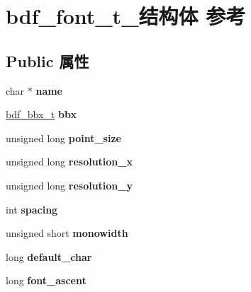 \hypertarget{structbdf__font__t__}{}\section{bdf\+\_\+font\+\_\+t\+\_\+结构体 参考}
\label{structbdf__font__t__}
\subsection*{Public 属性}
\begin{DoxyCompactItemize}
\item 
\mbox{\label{structbdf__font__t___a5913d87c013e04f6ed008bf2c1ae0502}} 
char $\ast$ {\bfseries name}
\item 
\mbox{\label{structbdf__font__t___ac25edda068db746ec01932109af48b4e}} 
\hyperlink{structbdf__bbx__t__}{bdf\+\_\+bbx\+\_\+t} {\bfseries bbx}
\item 
\mbox{\label{structbdf__font__t___a7b86c5e8b027880389d3255526579776}} 
unsigned long {\bfseries point\+\_\+size}
\item 
\mbox{\label{structbdf__font__t___afdd5a28e6c56664ebfd81fba2502fc71}} 
unsigned long {\bfseries resolution\+\_\+x}
\item 
\mbox{\label{structbdf__font__t___aeba1172f024b045f38e2ec774fdac0f2}} 
unsigned long {\bfseries resolution\+\_\+y}
\item 
\mbox{\label{structbdf__font__t___a694b45a3d4def047a24930af5d278f6b}} 
int {\bfseries spacing}
\item 
\mbox{\label{structbdf__font__t___a2b9b2e657fce04c5424a672a6bcbfa71}} 
unsigned short {\bfseries monowidth}
\item 
\mbox{\label{structbdf__font__t___a9dd5cd8b98d884377ad8d0fa1c23b02a}} 
long {\bfseries default\+\_\+char}
\item 
\mbox{\label{structbdf__font__t___ad084dda66e6006218775631e24a6c783}} 
long {\bfseries font\+\_\+ascent}

\end{DoxyCompactItemize}
